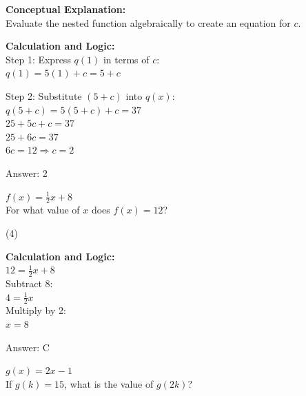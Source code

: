 \documentclass[11pt,paper=a4,answers]{exam}
\begin{document}
\begin{questions}
\begin{solution}
\textbf{Conceptual Explanation:} \\
Evaluate the nested function algebraically to create an equation for $c$.

\vspace{20pt}

\textbf{Calculation and Logic:} \\
Step 1: Express $q(1)$ in terms of $c$: \\
$q(1) = 5(1) + c = 5 + c$

\vspace{10pt}

Step 2: Substitute $(5+c)$ into $q(x)$: \\
$q(5+c) = 5(5+c) + c = 37$ \\
$25 + 5c + c = 37$ \\
$25 + 6c = 37$ \\
$6c = 12 \Rightarrow c = 2$

\vspace{25pt}

Answer: \colorbox{yellow!100}{2}
\end{solution}

\vspace{40pt}

\question
$f(x) = \frac{1}{2}x + 8$ \\
For what value of $x$ does $f(x) = 12$?
\begin{tasks}(4)
\end{tasks}

\begin{solution}
\textbf{Calculation and Logic:} \\
$12 = \frac{1}{2}x + 8$ \\
Subtract 8: \\
$4 = \frac{1}{2}x$ \\
Multiply by 2: \\
$x = 8$

\vspace{25pt}

Answer: \colorbox{yellow!100}{C}
\end{solution}

\vspace{40pt}

\question
$g(x) = 2x - 1$ \\
If $g(k) = 15$, what is the value of $g(2k)$?


\end{questions}
\end{document}
